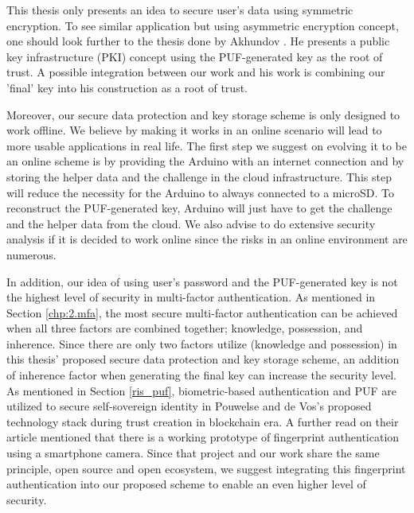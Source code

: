 This thesis only presents an idea to secure user's data using symmetric encryption. To see similar application but using asymmetric encryption concept, one should look further to the thesis done by Akhundov \cite{haji}. He presents a public key infrastructure (PKI) concept using the PUF-generated key as the root of trust. A possible integration between our work and his work is combining our 'final' key into his construction as a root of trust.

Moreover, our secure data protection and key storage scheme is only designed to work offline. We believe by making it works in an online scenario will lead to more usable applications in real life. The first step we suggest on evolving it to be an online scheme is by providing the Arduino with an internet connection and by storing the helper data and the challenge in the cloud infrastructure. This step will reduce the necessity for the Arduino to always connected to a microSD. To reconstruct the PUF-generated key, Arduino will just have to get the challenge and the helper data from the cloud. We also advise to do extensive security analysis if it is decided to work online since the risks in an online environment are numerous.

In addition, our idea of using user's password and the PUF-generated key is not the highest level of security in multi-factor authentication. As mentioned in Section \ref{chp:2.mfa}, the most secure multi-factor authentication can be achieved when all three factors are combined together; knowledge, possession, and inherence. Since there are only two factors utilize (knowledge and possession) in this thesis' proposed secure data protection and key storage scheme, an addition of inherence factor when generating the final key can increase the security level. As mentioned in Section \ref{ris_puf}, biometric-based authentication and PUF are utilized to secure self-sovereign identity in Pouwelse and de Vos's proposed technology stack during trust creation in blockchain era. A further read on their article mentioned that there is a working prototype of fingerprint authentication using a smartphone camera. Since that project and our work share the same principle, open source and open ecosystem, we suggest integrating this fingerprint authentication into our proposed scheme to enable an even higher level of security.
